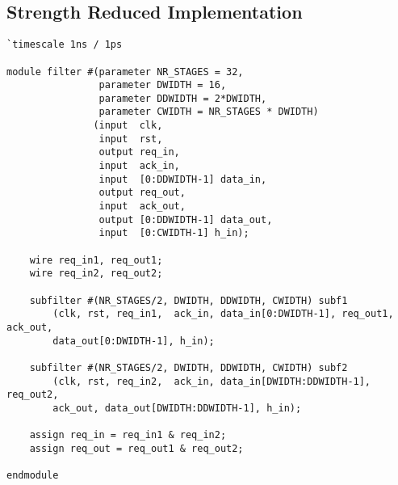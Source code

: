 \subsection{Strength Reduced Implementation}
\label{sec:source2}
\begin{verbatim}
`timescale 1ns / 1ps

module filter #(parameter NR_STAGES = 32,
                parameter DWIDTH = 16,
                parameter DDWIDTH = 2*DWIDTH,
                parameter CWIDTH = NR_STAGES * DWIDTH)
               (input  clk,
                input  rst,
                output req_in,
                input  ack_in,
                input  [0:DDWIDTH-1] data_in,
                output req_out,
                input  ack_out,
                output [0:DDWIDTH-1] data_out,
                input  [0:CWIDTH-1] h_in);

    wire req_in1, req_out1;
    wire req_in2, req_out2;

    subfilter #(NR_STAGES/2, DWIDTH, DDWIDTH, CWIDTH) subf1
        (clk, rst, req_in1,  ack_in, data_in[0:DWIDTH-1], req_out1, ack_out, 
        data_out[0:DWIDTH-1], h_in);

    subfilter #(NR_STAGES/2, DWIDTH, DDWIDTH, CWIDTH) subf2
        (clk, rst, req_in2,  ack_in, data_in[DWIDTH:DDWIDTH-1], req_out2,
        ack_out, data_out[DWIDTH:DDWIDTH-1], h_in);

    assign req_in = req_in1 & req_in2;
    assign req_out = req_out1 & req_out2;

endmodule

\end{verbatim}

